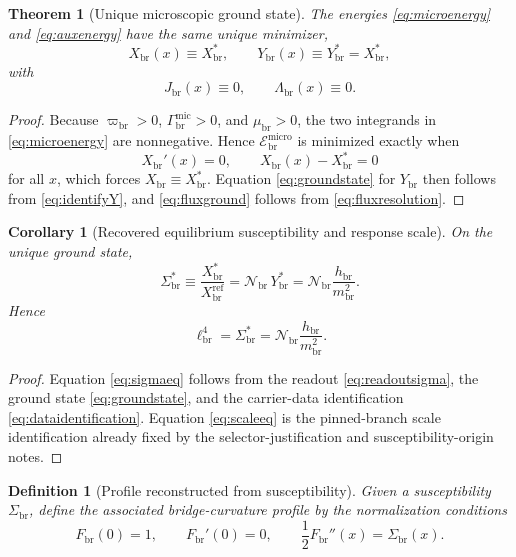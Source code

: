 \documentclass[11pt]{article}
\newcommand{\CurvScale}{\ell_{\mathrm{br}}}
\newcommand{\CurvProfile}{F_{\mathrm{br}}}
\newcommand{\ProfWeight}{\varpi_{\mathrm{br}}}
\newcommand{\RespSus}{\Sigma_{\mathrm{br}}}
\newcommand{\RespSusEq}{\Sigma_{\mathrm{br}}^{\ast}}
\newcommand{\RespCarrier}{Y_{\mathrm{br}}}
\newcommand{\RespFlux}{J_{\mathrm{br}}}
\newcommand{\RespCompat}{\Lambda_{\mathrm{br}}}
\newcommand{\RespNorm}{\mathcal N_{\mathrm{br}}}
\newcommand{\RespGap}{m_{\mathrm{br}}}
\newcommand{\RespBias}{h_{\mathrm{br}}}
\newcommand{\RespCarrierEq}{Y_{\mathrm{br}}^{\ast}}
\newcommand{\RespMicro}{X_{\mathrm{br}}}
\newcommand{\RespMicroEq}{X_{\mathrm{br}}^{\ast}}
\newcommand{\RespMicroRef}{X_{\mathrm{br}}^{\mathrm{ref}}}
\newcommand{\RespMicroFluxCoeff}{\Gamma_{\mathrm{br}}^{\mathrm{mic}}}
\newcommand{\RespMicroGap}{\mu_{\mathrm{br}}}
\newcommand{\RespMicroEnergy}{\mathscr E_{\mathrm{br}}^{\mathrm{micro}}}
\newtheorem{definition}{Definition}
\newtheorem{corollary}{Corollary}
\newtheorem{theorem}{Theorem}
\begin{document}
\begin{theorem}[Unique microscopic ground state]
\label{thm:ground}
The energies \eqref{eq:microenergy} and \eqref{eq:auxenergy} have the same unique minimizer,
\begin{equation}
\RespMicro(x)\equiv\RespMicroEq,
\qquad
\RespCarrier(x)\equiv\RespCarrierEq=\RespMicroEq,
\label{eq:groundstate}
\end{equation}
with
\begin{equation}
\RespFlux(x)\equiv0,
\qquad
\RespCompat(x)\equiv0.
\label{eq:fluxground}
\end{equation}
\end{theorem}

\begin{proof}
Because \(\ProfWeight>0\), \(\RespMicroFluxCoeff>0\), and \(\RespMicroGap>0\), the two integrands in \eqref{eq:microenergy} are nonnegative. Hence \(\RespMicroEnergy\) is minimized exactly when
\[
\RespMicro'(x)=0,
\qquad
\RespMicro(x)-\RespMicroEq=0
\]
for all \(x\), which forces \(\RespMicro\equiv\RespMicroEq\). Equation \eqref{eq:groundstate} for \(\RespCarrier\) then follows from \eqref{eq:identifyY}, and \eqref{eq:fluxground} follows from \eqref{eq:fluxresolution}.
\end{proof}

\begin{corollary}[Recovered equilibrium susceptibility and response scale]
\label{cor:sigmaeq}
On the unique ground state,
\begin{equation}
\RespSusEq
\equiv
\frac{\RespMicroEq}{\RespMicroRef}
=
\RespNorm\,\RespCarrierEq
=
\RespNorm\frac{\RespBias}{\RespGap^2}.
\label{eq:sigmaeq}
\end{equation}
Hence
\begin{equation}
\CurvScale^4=\RespSusEq=\RespNorm\frac{\RespBias}{\RespGap^2}.
\label{eq:scaleeq}
\end{equation}
\end{corollary}

\begin{proof}
Equation \eqref{eq:sigmaeq} follows from the readout \eqref{eq:readoutsigma}, the ground state \eqref{eq:groundstate}, and the carrier-data identification \eqref{eq:dataidentification}. Equation \eqref{eq:scaleeq} is the pinned-branch scale identification already fixed by the selector-justification and susceptibility-origin notes.
\end{proof}

\begin{definition}[Profile reconstructed from susceptibility]
\label{def:profilereconstruction}
Given a susceptibility \(\RespSus\), define the associated bridge-curvature profile by the normalization conditions
\begin{equation}
\CurvProfile(0)=1,
\qquad
\CurvProfile'(0)=0,
\qquad
\frac12\CurvProfile''(x)=\RespSus(x).
\label{eq:profilereconstruction}
\end{equation}
\end{definition}
\end{document}
